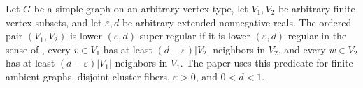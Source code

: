 \begin{definition}
Let $G$ be a simple graph on an arbitrary vertex type, let $V_1,V_2$ be arbitrary finite vertex subsets, and let $\varepsilon,d$ be arbitrary extended nonnegative reals.  The ordered pair $(V_1,V_2)$ is lower $(\varepsilon,d)$-super-regular if it is lower $(\varepsilon,d)$-regular in the sense of , every $v\in V_1$ has at least $(d-\varepsilon)|V_2|$ neighbors in $V_2$, and every $w\in V_2$ has at least $(d-\varepsilon)|V_1|$ neighbors in $V_1$.  The paper uses this predicate for finite ambient graphs, disjoint cluster fibers, $\varepsilon>0$, and $0<d<1$.
\end{definition}
